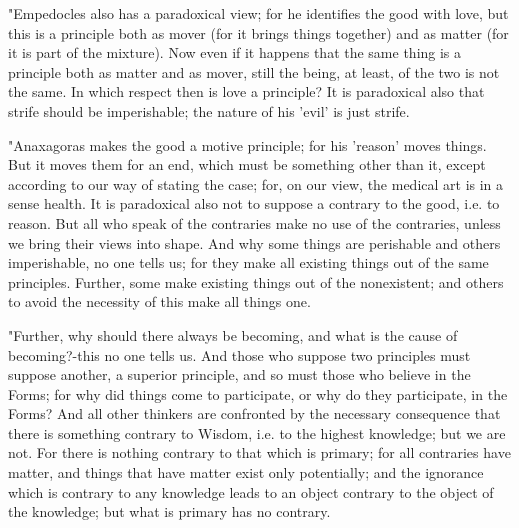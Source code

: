 "Empedocles also has a paradoxical view; for he identifies the good
with love, but this is a principle both as mover (for it brings things
together) and as matter (for it is part of the mixture). Now even
if it happens that the same thing is a principle both as matter and
as mover, still the being, at least, of the two is not the same. In
which respect then is love a principle? It is paradoxical also that
strife should be imperishable; the nature of his 'evil' is just strife.

"Anaxagoras makes the good a motive principle; for his 'reason' moves
things. But it moves them for an end, which must be something other
than it, except according to our way of stating the case; for, on
our view, the medical art is in a sense health. It is paradoxical
also not to suppose a contrary to the good, i.e. to reason. But all
who speak of the contraries make no use of the contraries, unless
we bring their views into shape. And why some things are perishable
and others imperishable, no one tells us; for they make all existing
things out of the same principles. Further, some make existing things
out of the nonexistent; and others to avoid the necessity of this
make all things one. 

"Further, why should there always be becoming, and what is the cause
of becoming?-this no one tells us. And those who suppose two principles
must suppose another, a superior principle, and so must those who
believe in the Forms; for why did things come to participate, or why
do they participate, in the Forms? And all other thinkers are confronted
by the necessary consequence that there is something contrary to Wisdom,
i.e. to the highest knowledge; but we are not. For there is nothing
contrary to that which is primary; for all contraries have matter,
and things that have matter exist only potentially; and the ignorance
which is contrary to any knowledge leads to an object contrary to
the object of the knowledge; but what is primary has no contrary.


